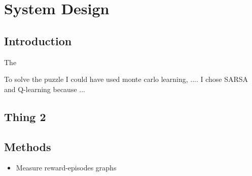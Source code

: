 \graphicspath{{System\_Design/fig}}
\chapter{System Design}
\label{chap:System_Design}

\section{Introduction}
The 

To solve the puzzle I could have used monte carlo learning, ....
I chose SARSA and Q-learning because ...
\section{Thing 2}

\section{Methods}
\begin{itemize}
	\item Measure reward-episodes graphs
\end{itemize}